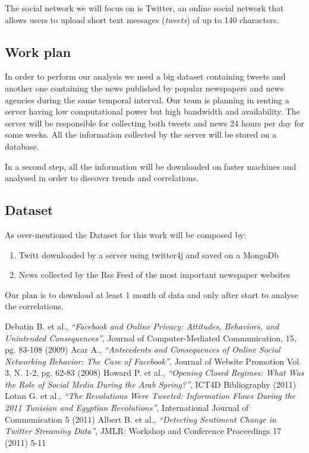\documentclass[a4paper]{article}
\begin{document}
The social network we will focus on is Twitter, an online social network that
allows users to upload short text messages (\emph{tweets}) of up to 140 characters.

\subsection{Work plan}
In order to perform our analysis we need a big dataset containing tweets and
another one containing the news published by popular newspapers and news
agencies during the same temporal interval. Our team is planning in renting a
server having low computational power but high bandwidth and availability. The
server will be responsible for collecting both tweets and news 24 hours per day
for some weeks. All the information collected by the server will be stored on a
database.

In a second step, all the information will be downloaded on faster machines and
analysed in order to discover trends and correlations. 

\subsection{Dataset}

As over-mentioned the Dataset for this work will be composed by:

\begin{enumerate}
	\item Twitt downloaded by a server using twitter4j and saved on a MongoDb
	\item News collected by the Rss Feed of the most important newspaper websites
\end{enumerate}

Our plan is to download at least 1 month of data and only after start to analyse the correlations.

\begin{thebibliography}{9}
Debatin B. et al., \emph{``Facebook and Online Privacy: Attitudes, Behaviors,
and Unintended Consequences''}, Journal of Computer-Mediated Communication,
15, pg. 83-108 (2009)
Acar A., \emph{``Antecedents and Consequences of Online Social Networking
Behavior: The Case of Facebook''}, Journal of Website Promotion Vol. 3, N.
1-2, pg. 62-83 (2008)
Howard P. et al., \emph{``Opening Closed Regimes: What Was the Role of Social Media
During the Arab Spring?''}, ICT4D Bibliography (2011)
Lotan G. et al., \emph{``The Revolutions Were Tweeted: Information Flows During
the 2011 Tunisian and Egyptian Revolutions''}, International Journal of
Communication 5 (2011)
Albert B. et al., \emph{``Detecting Sentiment Change in Twitter Streaming Data''}, JMLR: Workshop and Conference Proceedings 17 (2011) 5-11
\end{thebibliography}
\end{document}
